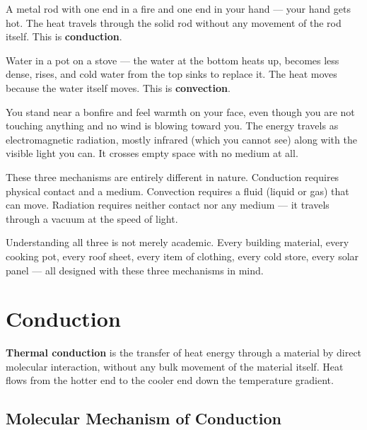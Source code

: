 A metal rod with one end in a fire and one end in
your hand --- your hand gets hot. The heat travels
through the solid rod without any movement of the
rod itself. This is \textbf{conduction}.

Water in a pot on a stove --- the water at the bottom
heats up, becomes less dense, rises, and cold water
from the top sinks to replace it. The heat moves
because the water itself moves. This is
\textbf{convection}.

You stand near a bonfire and feel warmth on your
face, even though you are not touching anything and
no wind is blowing toward you. The energy travels as electromagnetic radiation, mostly infrared
(which you cannot see) along with the visible light you can. It
crosses empty space with no medium at all.

These three mechanisms are entirely different in
nature. Conduction requires physical contact and a
medium. Convection requires a fluid (liquid or gas)
that can move. Radiation requires neither contact
nor any medium --- it travels through a vacuum at
the speed of light.

Understanding all three is not merely academic.
Every building material, every cooking pot, every
roof sheet, every item of clothing, every cold store,
every solar panel --- all designed with these three
mechanisms in mind.

\section{Conduction}

\begin{definitionbox}
\textbf{Thermal conduction} is the transfer of heat
energy through a material by direct molecular
interaction, without any bulk movement of the material
itself. Heat flows from the hotter end to the cooler
end down the temperature gradient.
\end{definitionbox}

\subsection{Molecular Mechanism of Conduction}

